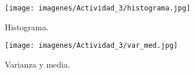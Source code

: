 	\begin{figure}[H]
		\centering
		\texttt{[image: imagenes/Actividad\_3/histograma.jpg]}
		\caption{Histograma.}
		\label{fig:4d}
	\end{figure}
	
	
	\begin{figure}[H]
		\centering
		\texttt{[image: imagenes/Actividad\_3/var\_med.jpg]}
		\caption{Varianza y media.}
		\label{fig:var_med}
	\end{figure}

